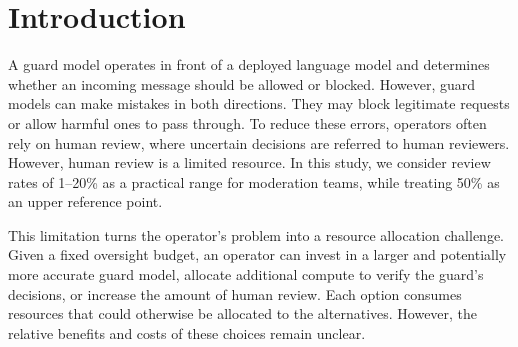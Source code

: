 \documentclass[11pt]{article}
\begin{document}
\begin{abstract}
The more important question is why these strategies have limited effectiveness. The main limitation is not computational capacity but error identification, specifically, the ability to determine which decisions are incorrect. An oracle routing strategy that selects whichever of two guards would produce the correct answer for each prompt could reduce errors by 26.3\% (95\% CI [23.5, 29.2]) while using half the compute required by the larger guard. However, the best available escalation signal fails to capture this potential improvement: its realized gain is $-0.0002$, which is statistically indistinguishable from zero (95\% CI [$-0.0017$, $+0.0012$]). This identification problem becomes more severe as input length increases. For 2.85\% of prompts, all three guards agree on the same answer, yet all three are incorrect, even though their confidence scores are high. The frequency of these failures increases by approximately ninefold between the shortest and longest fifths of prompts. Input length also affects the perturbation signal: the number of usable rewordings available for each prompt decreases as prompts become longer, with a rank correlation of $-1.0$ across datasets. Since benchmarks made up of short prompts contain relatively little variation in prompt length, they may fail to reveal both of these effects.

\medskip
\noindent Code and data: \url{https://github.com/zarif007/guard-uncertainty-routing}
\end{abstract}

\section{Introduction}

A guard model operates in front of a deployed language model and determines whether an incoming message should be allowed or blocked. However, guard models can make mistakes in both directions. They may block legitimate requests or allow harmful ones to pass through. To reduce these errors, operators often rely on human review, where uncertain decisions are referred to human reviewers. However, human review is a limited resource. In this study, we consider review rates of 1--20\% as a practical range for moderation teams, while treating 50\% as an upper reference point.

This limitation turns the operator's problem into a resource allocation challenge. Given a fixed oversight budget, an operator can invest in a larger and potentially more accurate guard model, allocate additional compute to verify the guard's decisions, or increase the amount of human review. Each option consumes resources that could otherwise be allocated to the alternatives. However, the relative benefits and costs of these choices remain unclear.
\end{document}
